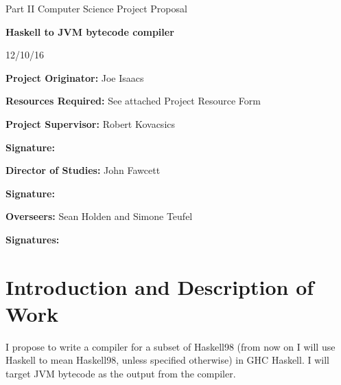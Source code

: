 \documentclass[a4paper]{article}
\begin{document}
\thispagestyle{empty}

\medskip
{}
\medskip
{}

\vfil

\centerline{\large Part II Computer Science Project Proposal}
\vspace{0.4in}
\centerline{\Large\bf Haskell to JVM bytecode compiler}
\vspace{0.3in}
\centerline{\large 12/10/16}

\vfil

{\bf Project Originator:} Joe Isaacs

\vspace{0.1in}

{\bf Resources Required:} See attached Project Resource Form

\vspace{0.5in}

{\bf Project Supervisor:} Robert Kovacsics

\vspace{0.2in}

{\bf Signature:}

\vspace{0.5in}

{\bf Director of Studies:}  John Fawcett

\vspace{0.2in}

{\bf Signature:}

\vspace{0.5in}

{\bf Overseers:} Sean Holden and Simone Teufel

\vspace{0.2in}

{\bf Signatures:}

\vfil
\eject



\section*{Introduction and Description of Work}

  I propose to write a compiler for a subset of Haskell98 (from now on I will use Haskell to mean Haskell98, unless specified otherwise)
  in GHC Haskell. I will target JVM bytecode as the output from the compiler.
\end{document}

